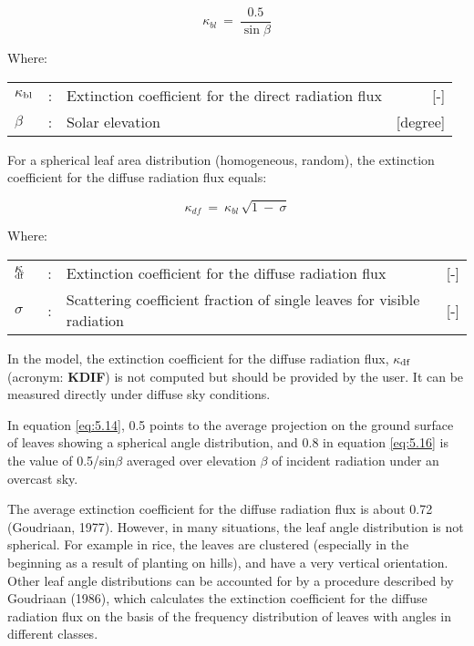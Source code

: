 \begin{equation}
\label{eq:5.14}
\kappa_{bl} ~=~{\frac{0.5}{\sin \beta }}
\end{equation}

Where:\\[5pt]
\begin{tabularx}{\textwidth}{llXr}
	$\kappa$$_{{\rm bl}}$ &:& Extinction coefficient for the direct radiation flux   &     [-]\\
	$\beta$ &:& Solar elevation    &    [degree]\\
\end{tabularx}

For a spherical leaf area distribution (homogeneous, random), the extinction coefficient
for the diffuse radiation flux equals:

\begin{equation}
\label{eq:5.15}
\kappa_{df} ~=~ \kappa_{bl} \, \sqrt{1~-~ \sigma }
\end{equation}

Where:\\[5pt]
\begin{tabularx}{\textwidth}{llXr}
	$\kappa$$_{{\rm df}}$ &:& Extinction coefficient for the diffuse radiation flux    &    [-]\\
	$\sigma$ &:& Scattering coefficient fraction of single leaves for 
	visible radiation    &    [-]\\
\end{tabularx}

In the model, the extinction coefficient for the diffuse radiation flux, 
{\bf $\kappa$$_{{\rm df}}$} (acronym: {\bf KDIF})
is not computed but should be provided by the user. It can be measured directly 
under diffuse sky conditions.

In equation \ref{eq:5.14}, 0.5 points to the average projection on the ground surface of leaves
showing a spherical angle distribution, and 0.8 in equation \ref{eq:5.16} is the value of 0.5/sin$\beta$
averaged over elevation $\beta$ of incident radiation under an overcast sky.

The average extinction coefficient for the diffuse radiation flux is about 0.72 (Goudriaan,
1977). However, in many situations, the leaf angle distribution is not spherical. For
example in rice, the leaves are clustered (especially in the beginning as a result of
planting on hills), and have a very vertical orientation. Other leaf angle distributions can
be accounted for by a procedure described by Goudriaan (1986), which calculates the
extinction coefficient for the diffuse radiation flux on the basis of the frequency 
distribution of leaves with angles in different classes.

